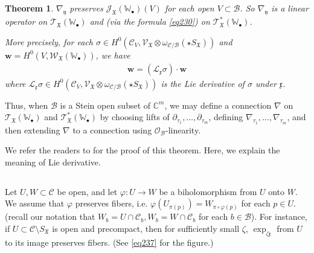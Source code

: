 \documentclass[12pt,a4paper,notitlepage]{article}
\theoremstyle{definition}
\theoremstyle{plain}
\newtheorem{thm}[df]{Theorem}
\newcommand{\fk}{\mathfrak}
\newcommand{\mc}{\mathcal}
\newcommand{\scr}{\mathscr}
\newcommand{\xk}{\mathfrak x}
\newcommand{\yk}{\mathfrak y}
\newcommand{\SX}{{S_{\fk X}}}
\newcommand{\blt}{\bullet}
\newcommand{\Wbb}{\mathbb W}
\newcommand{\Cbb}{\mathbb C}
\newcommand{\wbf}{\mathbf w}
\numberwithin{equation}{section}
\begin{document}
\subsection{}


\begin{thm}\label{lb132}
$\nabla_\yk$ preserves $\scr J_{\fk X}(\Wbb_\blt)(V)$ for each open $V\subset\mc B$. So $\nabla_\yk$ is a linear operator on $\scr T_{\fk X}(\Wbb_\blt)$ and (via the formula \eqref{eq230}) on $\scr T^*_{\fk X}(\Wbb_\blt)$.

More precisely, for each $\sigma\in H^0(\mc C_V,\scr V_{\fk X}\otimes\omega_{\mc C/\mc B}(\star\SX))$ and $\wbf=H^0(V,\scr W_{\fk X}(\Wbb_\blt))$, we have
\begin{align}
[\nabla_\yk,\sigma]\wbf=(\mc L_\xk \sigma)\cdot\wbf
\end{align}
where $\mc L_\xk\sigma\in H^0(\mc C_V,\scr V_{\fk X}\otimes\omega_{\mc C/\mc B}(\star\SX))$ is the Lie derivative of $\sigma$ under $\xk$.
\end{thm}

Thus, when $\mc B$ is a Stein open subset of $\Cbb^m$, we may define a connection $\nabla$ on $\scr T_{\fk X}(\Wbb_\blt)$ and $\scr T_{\fk X}^*(\Wbb_\blt)$ by choosing lifts of $\partial_{\tau_1},\dots,\partial_{\tau_m}$, defining $\nabla_{\tau_1},\dots,\nabla_{\tau_m}$, and then extending $\nabla$ to a connection using $\scr O_{\mc B}$-linearity.

We refer the readers to \cite[Sec. 3.6]{Gui} for the proof of this theorem. Here, we explain the meaning of Lie derivative. 

\subsection{}

Let $U,W\subset\mc C$ be open, and let $\varphi:U\rightarrow W$ be a biholomorphism from $U$ onto $W$. We assume that $\varphi$ preserves fibers, i.e. $\varphi(U_{\pi(p)})=W_{\pi\circ\varphi(p)}$ for each $p\in U$. (recall our notation that $W_b=U\cap\mc C_b,W_b=W\cap\mc C_b$ for each $b\in\mc B$). For instance, if $U\subset\mc C\setminus\SX$ is open and precompact, then for sufficiently small $\zeta$,  $\exp_{\zeta\xk}$ from $U$ to its image preserves fibers. (See \eqref{eq237} for the figure.)
\end{document}
